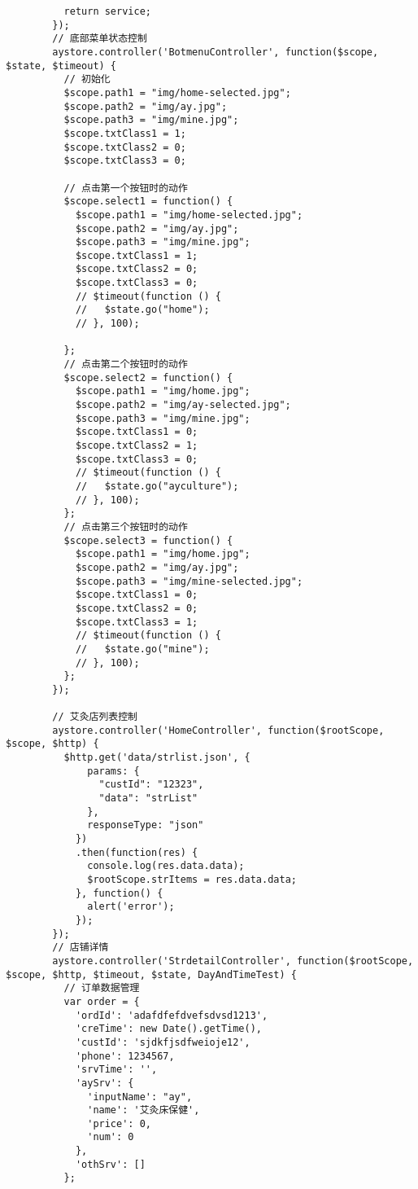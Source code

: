 \begin{lstlisting}
          return service;
        });
        // 底部菜单状态控制
        aystore.controller('BotmenuController', function($scope, $state, $timeout) {
          // 初始化
          $scope.path1 = "img/home-selected.jpg";
          $scope.path2 = "img/ay.jpg";
          $scope.path3 = "img/mine.jpg";
          $scope.txtClass1 = 1;
          $scope.txtClass2 = 0;
          $scope.txtClass3 = 0;

          // 点击第一个按钮时的动作
          $scope.select1 = function() {
            $scope.path1 = "img/home-selected.jpg";
            $scope.path2 = "img/ay.jpg";
            $scope.path3 = "img/mine.jpg";
            $scope.txtClass1 = 1;
            $scope.txtClass2 = 0;
            $scope.txtClass3 = 0;
            // $timeout(function () {
            //   $state.go("home");
            // }, 100);

          };
          // 点击第二个按钮时的动作
          $scope.select2 = function() {
            $scope.path1 = "img/home.jpg";
            $scope.path2 = "img/ay-selected.jpg";
            $scope.path3 = "img/mine.jpg";
            $scope.txtClass1 = 0;
            $scope.txtClass2 = 1;
            $scope.txtClass3 = 0;
            // $timeout(function () {
            //   $state.go("ayculture");
            // }, 100);
          };
          // 点击第三个按钮时的动作
          $scope.select3 = function() {
            $scope.path1 = "img/home.jpg";
            $scope.path2 = "img/ay.jpg";
            $scope.path3 = "img/mine-selected.jpg";
            $scope.txtClass1 = 0;
            $scope.txtClass2 = 0;
            $scope.txtClass3 = 1;
            // $timeout(function () {
            //   $state.go("mine");
            // }, 100);
          };
        });

        // 艾灸店列表控制
        aystore.controller('HomeController', function($rootScope, $scope, $http) {
          $http.get('data/strlist.json', {
              params: {
                "custId": "12323",
                "data": "strList"
              },
              responseType: "json"
            })
            .then(function(res) {
              console.log(res.data.data);
              $rootScope.strItems = res.data.data;
            }, function() {
              alert('error');
            });
        });
        // 店铺详情
        aystore.controller('StrdetailController', function($rootScope, $scope, $http, $timeout, $state, DayAndTimeTest) {
          // 订单数据管理
          var order = {
            'ordId': 'adafdfefdvefsdvsd1213',
            'creTime': new Date().getTime(),
            'custId': 'sjdkfjsdfweioje12',
            'phone': 1234567,
            'srvTime': '',
            'aySrv': {
              'inputName': "ay",
              'name': '艾灸床保健',
              'price': 0,
              'num': 0
            },
            'othSrv': []
          };


\end{lstlisting}
